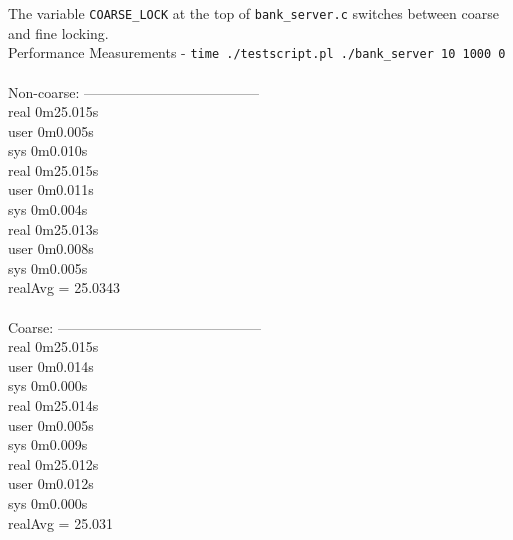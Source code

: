 \documentclass[12pt]{article}
\begin{document}
\pagebreak


\noindent The variable \verb!COARSE_LOCK! at the top of \verb!bank_server.c! switches between coarse and fine locking.\\

\noindent Performance Measurements - \verb!time ./testscript.pl ./bank_server 10 1000 0!\\\\
Non-coarse: --------------------------------------\\

\noindent real	0m25.015s\\
user	0m0.005s\\
sys	    0m0.010s\\

\noindent real	0m25.015s\\
user	0m0.011s\\
sys	    0m0.004s\\

\noindent real    0m25.013s\\
user	0m0.008s\\
sys	0m0.005s\\

\noindent realAvg = 25.0343\\\\


\noindent Coarse: --------------------------------------------\\

\noindent real	0m25.015s\\
user	0m0.014s\\
sys	0m0.000s\\

\noindent real	0m25.014s\\
user	0m0.005s\\
sys	0m0.009s\\

\noindent real	0m25.012s\\
user	0m0.012s\\
sys	0m0.000s\\

\noindent realAvg = 25.031\\
\end{document}
